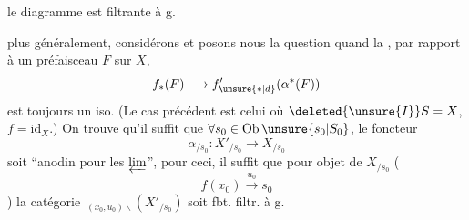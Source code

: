 le diagramme
est  filtrante à g.

plus généralement, considérons
et posons nous la question quand la  , par rapport à un préfaisceau $F$  sur $X$,
\[
 f_*(F)\longrightarrow f'_{\unsure{*|d}}(\alpha^*(F))
\]
est toujours un iso. (Le cas précédent est celui où $\deleted{\unsure{I}}S=X$, $f=\mathrm{id}_X$.) On trouve qu'il suffit que $\forall s_0\in\operatorname{Ob}\unsure{s_0|S_0}$, le foncteur
\[
 \alpha_{/s_0}:X'_{/s_0}\longrightarrow X_{/s_0}
\]
soit ``anodin pour les $\varprojlim$'',  pour ceci, il suffit que pour objet  de $X_{/s_0}$ (
\[
 f(x_0)\xrightarrow{u_0}s_0
\]
) la catégorie $\,{}_{(x_0,u_0)\backslash}(X'_{/s_0})$ soit fbt. filtr. à g.
